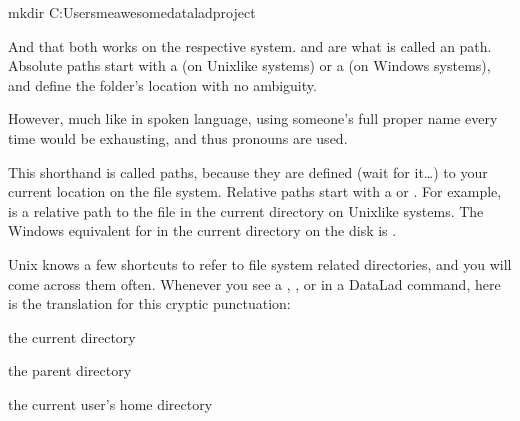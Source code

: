 \begin{sphinxVerbatim}[commandchars=\\\{\}]
\PYGZdl{} mkdir C:\PYGZbs{}Users\PYGZbs{}me\PYGZbs{}awesome\PYGZus{}datalad\PYGZus{}project
\end{sphinxVerbatim}

\sphinxAtStartPar
And that both works on the respective system.  and  are what is called an 
path.
Absolute paths  start with a \sphinxcode{\sphinxupquote{/}} (on Unix\sphinxhyphen{}like systems) or a \sphinxcode{\sphinxupquote{\textbackslash{}}} (on Windows systems), and define the folder’s location with no ambiguity.

\sphinxAtStartPar
However, much like in spoken language, using someone’s full proper name every
time would be exhausting, and thus pronouns are used.

\sphinxAtStartPar
This shorthand is called  paths, because they are defined (wait for it…)
 to your current location on the file system. Relative paths  start
with a \sphinxcode{\sphinxupquote{/}} or \sphinxcode{\sphinxupquote{\textbackslash{}}}.
For example,  is a relative path to the file  in the current directory on Unix\sphinxhyphen{}like systems.
The Windows equivalent for  in the current directory on the  disk is .

\sphinxAtStartPar
Unix knows a few shortcuts to refer to file system related directories, and you will
come across them often. Whenever you see a , , or \sphinxcode{\sphinxupquote{\textasciitilde{}}} in a DataLad command,
here is the translation for this cryptic punctuation:
\begin{description}
\sphinxAtStartPar
the current directory

\sphinxAtStartPar
the parent directory

\sphinxlineitem{\sphinxcode{\sphinxupquote{\textasciitilde{}}}}
\sphinxAtStartPar
the current user’s home directory

\end{description}

